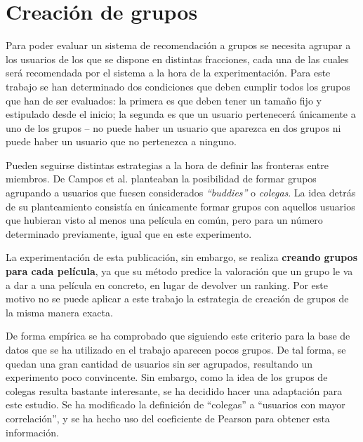 \section{Creación de grupos}

Para poder evaluar un sistema de recomendación a grupos se necesita agrupar a los usuarios de los que se dispone en distintas fracciones, cada una de las cuales será recomendada por el sistema a la hora de la experimentación. Para este trabajo se han determinado dos condiciones que deben cumplir todos los grupos que han de ser evaluados: la primera es que deben tener un tamaño fijo y estipulado desde el inicio; la segunda es que un usuario pertenecerá únicamente a uno de los grupos -- no puede haber un usuario que aparezca en dos grupos ni puede haber un usuario que no pertenezca a ninguno.

Pueden seguirse distintas estrategias a la hora de definir las fronteras entre miembros. De Campos et al. \cite{umuai} planteaban la posibilidad de formar grupos agrupando a usuarios que fuesen considerados \textit{``buddies''} o \textit{colegas}. La idea detrás de su planteamiento consistía en únicamente formar grupos con aquellos usuarios que hubieran visto al menos una película en común, pero para un número determinado previamente, igual que en este experimento.

La experimentación de esta publicación, sin embargo, se realiza \textbf{creando grupos para cada película}, ya que su método predice la valoración que un grupo le va a dar a una película en concreto, en lugar de devolver un ranking. Por este motivo no se puede aplicar a este trabajo la estrategia de creación de grupos de la misma manera exacta.

De forma empírica se ha comprobado que siguiendo este criterio para la base de datos que se ha utilizado en el trabajo aparecen pocos grupos. De tal forma, se quedan una gran cantidad de usuarios sin ser agrupados, resultando un experimento poco convincente. Sin embargo, como la idea de los grupos de colegas resulta bastante interesante, se ha decidido hacer una adaptación para este estudio. Se ha modificado la definición de ``colegas'' a ``usuarios con mayor correlación'', y se ha hecho uso del coeficiente de Pearson para obtener esta información.

